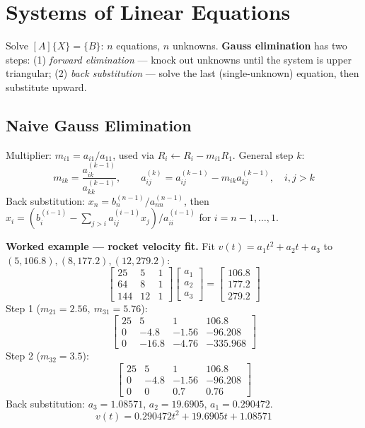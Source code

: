\section{Systems of Linear Equations}

\begin{defbox}
Solve $[A]\{X\}=\{B\}$: $n$ equations, $n$ unknowns. \textbf{Gauss elimination} has two steps: (1) \emph{forward elimination} — knock out unknowns until the system is upper triangular; (2) \emph{back substitution} — solve the last (single-unknown) equation, then substitute upward.
\end{defbox}

\subsection{Naive Gauss Elimination}

Multiplier: $m_{i1}=a_{i1}/a_{11}$, used via $R_i\leftarrow R_i-m_{i1}R_1$. General step $k$:
\[
m_{ik} = \frac{a_{ik}^{(k-1)}}{a_{kk}^{(k-1)}}, \qquad a_{ij}^{(k)} = a_{ij}^{(k-1)} - m_{ik}a_{kj}^{(k-1)}, \quad i,j>k
\]
Back substitution: $x_n = b_n^{(n-1)}/a_{nn}^{(n-1)}$, then $x_i = \left(b_i^{(i-1)}-\sum_{j>i}a_{ij}^{(i-1)}x_j\right)/a_{ii}^{(i-1)}$ for $i=n-1,\dots,1$.

\begin{examplebox}
\textbf{Worked example — rocket velocity fit.} Fit $v(t)=a_1t^2+a_2t+a_3$ to $(5,106.8),(8,177.2),(12,279.2)$:
\[
\begin{bmatrix}25&5&1\\64&8&1\\144&12&1\end{bmatrix}\!\begin{bmatrix}a_1\\a_2\\a_3\end{bmatrix}=\begin{bmatrix}106.8\\177.2\\279.2\end{bmatrix}
\]
Step 1 ($m_{21}=2.56,\ m_{31}=5.76$):
\[
\begin{bmatrix}25&5&1&106.8\\0&-4.8&-1.56&-96.208\\0&-16.8&-4.76&-335.968\end{bmatrix}
\]
Step 2 ($m_{32}=3.5$):
\[
\begin{bmatrix}25&5&1&106.8\\0&-4.8&-1.56&-96.208\\0&0&0.7&0.76\end{bmatrix}
\]
Back substitution: $a_3=1.08571$, $a_2=19.6905$, $a_1=0.290472$.
\[
v(t)=0.290472t^2+19.6905t+1.08571
\]
\end{examplebox}

